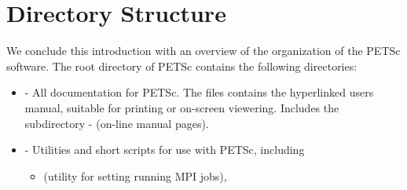 
\section{Directory Structure}

We conclude this introduction with an overview of the
organization of the PETSc software.
The root directory of PETSc contains the following directories:

\begin{itemize}
\item {} - All documentation for PETSc. The files 
                   contains the hyperlinked users manual, suitable for printing
                   or on-screen viewering. Includes the subdirectory
 \subitem -  (on-line manual pages).
\item {} - Utilities and short scripts for use with PETSc, including
 \begin{itemize}
 \item {} (utility for setting running MPI jobs),
 \end{itemize}


\end{itemize}
